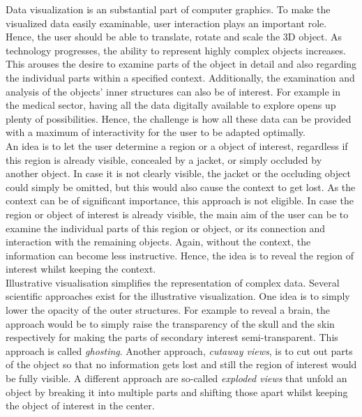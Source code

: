 

Data visualization is an substantial part of computer graphics. To make the visualized data easily examinable, user interaction plays an important role. Hence, the user should be able to translate, rotate and scale the 3D object. As technology progresses, the ability to represent highly complex objects increases. This arouses the desire to examine parts of the object in detail and also regarding the individual parts within a specified context. Additionally, the examination and analysis of the objects' inner structures can also be of interest. For example in the medical sector, having all the data digitally available to explore opens up plenty of possibilities. Hence, the challenge is how all these data can be provided with a maximum of interactivity for the user to be adapted optimally.\\
\newline
An idea is to let the user determine a region or a object of interest, regardless if this region is already visible, concealed by a jacket, or simply occluded by another object. In case it is not clearly visible, the jacket or the occluding object could simply be omitted, but this would also cause the context to get lost. As the context can be of significant importance, this approach is not eligible. In case the region or object of interest is already visible, the main aim of the user can be to examine the individual parts of this region or object, or its connection and interaction with the remaining objects. Again, without the context, the information can become less instructive. Hence, the idea is to reveal the region of interest whilst keeping the context.\\
\newline
Illustrative visualisation simplifies the representation of complex data. Several scientific approaches exist for the illustrative visualization. One idea is to simply lower the opacity of the outer structures. For example to reveal a brain, the approach would be to simply raise the transparency of the skull and the skin respectively for making the parts of secondary interest semi-transparent. This approach is called \emph{ghosting}. Another approach, \emph{cutaway views}, is to cut out parts of the object so that no information gets lost and still the region of interest would be fully visible. A different approach are so-called \emph{exploded views} that unfold an object by breaking it into multiple parts and shifting those apart whilst keeping the object of interest in the center.

